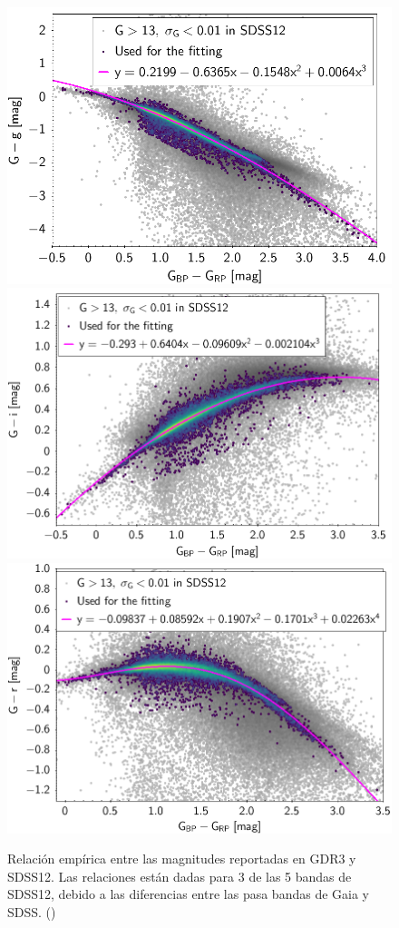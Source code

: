 \begin{figure}[!ht]
	\centering
	\includegraphics[scale=0.23]{Muestra/Secciones/Figures/Gaia-SDSS-Transform-g.png}
	\includegraphics[scale=0.23]{Muestra/Secciones/Figures/Gaia-SDSS-Transform-i.png}
	\includegraphics[scale=0.23]{Muestra/Secciones/Figures/Gaia-SDSS-Transform-r.png}

	\caption{Relación empírica entre las magnitudes reportadas en GDR3 y SDSS12.
	Las relaciones están dadas para 3 de las 5 bandas de SDSS12, debido a las
	diferencias entre las pasa bandas de Gaia y SDSS.
	()}
	\label{gdr3SdssConversionGraphs}
\end{figure}

